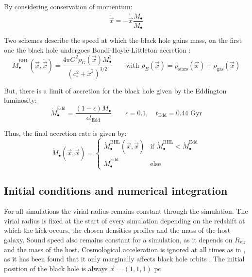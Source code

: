 			By considering conservation of momentum:
			\begin{equation}
				\ddot{\vec{x}} = - \dot{\vec{x}}\dfrac{\dot{M}_\bullet}{M_\bullet}
			\end{equation}
			
			Two schemes describe the speed at which the black hole gains mass, on the first one the black hole undergoes Bondi-Hoyle-Littleton accretion \cite{tanaka2009assembly, choksi2017recoiling}:
			\begin{equation}
				\dot{M}_\bullet^\text{BHL}(\vec{x}, \dot{\vec{x}}) = \dfrac{4\pi G^2 \rho_G(\vec{x})M^2_\bullet}{\left(c_s^2 + \dot{x}^2\right)^{3/2}} \qquad \text{with } \rho_B(\vec{x}) = \rho_\text{stars}(\vec{x}) + \rho_\text{gas}(\vec{x})
			\end{equation}
			
			But, there is a limit of accretion for the black hole given by the Eddington luminosity:
			\begin{equation}\label{eq: eddington}
				\dot{M}_\bullet^\text{Edd} = \dfrac{(1 - \epsilon)M_\bullet}{\epsilon t_\text{Edd}} \qquad \epsilon = 0.1, \quad t_\text{Edd} = 0.44 \text{ Gyr}
			\end{equation}
			
			Thus, the final accretion rate is given by:
			\begin{equation}
				\dot{M}_\bullet(\vec{x}, \dot{\vec{x}}) = \left\{
				\begin{array}{lc}
				\dot{M}_\bullet^\text{BHL}(\vec{x}, \dot{\vec{x}}) & \text{if $\dot{M}_\bullet^\text{BHL} < \dot{M}_\bullet^\text{Edd}$} \\
				\dot{M}_\bullet^\text{Edd} & \text{else}
				\end{array}
				\right.
			\end{equation}
	
	\subsection{Initial conditions and numerical integration}
		For all simulations the virial radius remains constant through the simulation. The virial radius is fixed at the start of every simulation depending on the redshift at which the kick occurs, the chosen densities profiles and the mass of the host galaxy. Sound speed also remains constant for a simulation, as it depends on $R_\text{vir}$ and the mass of the host. Cosmological acceleration is ignored at all times as in \citeauthor{tanaka2009assembly}, as it has been found that it only marginally affects black hole orbits \cite{choksi2017recoiling}. The initial position of the black hole is always $\vec{x} = (1, 1, 1)$ pc.
		
